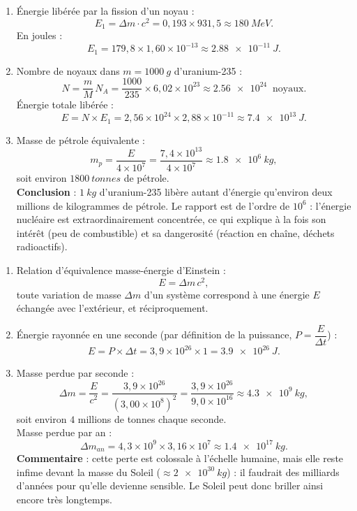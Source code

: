 \documentclass[11pt]{article}
\begin{document}
\begin{corrige}
\begin{enumerate}
\item Énergie libérée par la fission d'un noyau :
\[ E_1 = \Delta m \cdot c^2 = 0,193 \times 931,5 \approx \SI{180}{MeV}. \]
En joules :
\[ E_1 = 179,8 \times 1,60\times 10^{-13} \approx \SI{2,88e-11}{J}. \]
\item Nombre de noyaux dans $m = \SI{1000}{g}$ d'uranium-235 :
\[ N = \frac{m}{M}\,N_A = \frac{1000}{235} \times 6,02\times 10^{23} \approx \SI{2,56e24}{} \text{ noyaux}. \]
Énergie totale libérée :
\[ E = N \times E_1 = 2,56\times 10^{24} \times 2,88\times 10^{-11} \approx \SI{7,4e13}{J}. \]
\item Masse de pétrole équivalente :
\[ m_p = \frac{E}{4\times 10^{7}} = \frac{7,4\times 10^{13}}{4\times 10^{7}} \approx \SI{1,8e6}{kg}, \]
soit environ $\SI{1800}{tonnes}$ de pétrole.\\
\textbf{Conclusion} : $\SI{1}{kg}$ d'uranium-235 libère autant d'énergie qu'environ deux millions de kilogrammes de pétrole. Le rapport est de l'ordre de $10^6$ : l'énergie nucléaire est extraordinairement concentrée, ce qui explique à la fois son intérêt (peu de combustible) et sa dangerosité (réaction en chaîne, déchets radioactifs).
\end{enumerate}
\end{corrige}

\begin{corrige}
\begin{enumerate}
\item Relation d'équivalence masse-énergie d'Einstein :
\[ E = \Delta m\,c^2, \]
toute variation de masse $\Delta m$ d'un système correspond à une énergie $E$ échangée avec l'extérieur, et réciproquement.
\item Énergie rayonnée en une seconde (par définition de la puissance, $P = \dfrac{E}{\Delta t}$) :
\[ E = P \times \Delta t = 3,9\times 10^{26} \times 1 = \SI{3,9e26}{J}. \]
\item Masse perdue par seconde :
\[ \Delta m = \frac{E}{c^2} = \frac{3,9\times 10^{26}}{(3,00\times 10^{8})^2} = \frac{3,9\times 10^{26}}{9,0\times 10^{16}} \approx \SI{4,3e9}{kg}, \]
soit environ $4$ millions de tonnes chaque seconde.\\
Masse perdue par an :
\[ \Delta m_{an} = 4,3\times 10^{9} \times 3,16\times 10^{7} \approx \SI{1,4e17}{kg}. \]
\textbf{Commentaire} : cette perte est colossale à l'échelle humaine, mais elle reste infime devant la masse du Soleil ($\approx \SI{2e30}{kg}$) : il faudrait des milliards d'années pour qu'elle devienne sensible. Le Soleil peut donc briller ainsi encore très longtemps.
\end{enumerate}
\end{corrige}
\end{document}

